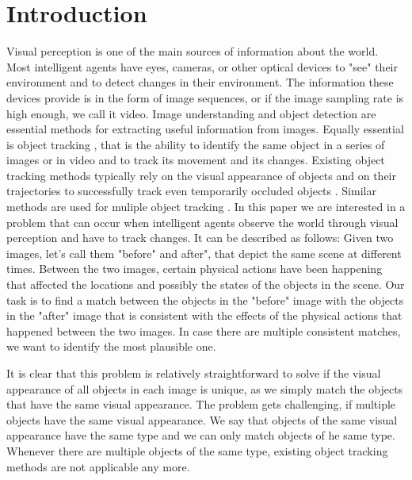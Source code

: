 \documentclass[letterpaper]{article}
\begin{document}
    

\section{Introduction}

Visual perception is one of the main sources of information about the world. Most intelligent agents have eyes, cameras, or other optical devices to "see" their environment and to detect changes in their environment. The information these devices provide is in the form of image sequences, or if the image sampling rate is high enough, we call it video.
Image understanding \cite{} and object detection \cite{} are essential methods for extracting useful information from images. Equally essential is object tracking \cite{}, that is the ability to identify the same object in a series of images or in video and to track its movement and its changes. Existing object tracking methods typically rely on the visual appearance of objects and on their trajectories to successfully track even temporarily occluded objects \cite{}.
Similar methods are used for muliple object tracking \cite{}.
In this paper we are interested in a problem that can occur when intelligent agents observe the world through visual perception and have to track changes.
It can be described as follows: Given two images, let's call them "before" and after", that depict the same scene at different times. Between the two images, certain physical actions have been happening that affected the locations and possibly the states of the objects in the scene. Our task is to find a match between the objects in the "before" image with the objects in the "after" image that is consistent with the effects of the physical actions that happened between the two images. In case there are multiple consistent matches, we want to identify the most plausible one.

It is clear that this problem is relatively straightforward to solve if the visual appearance of all objects in each image is unique, as we simply match the objects that have the same visual appearance. The problem gets challenging, if multiple objects have the same visual appearance. We say that objects of the same visual appearance have the same type and we can only match objects of he same type. Whenever there are multiple objects of the same type, existing object tracking methods are not applicable any more.
\end{document}
